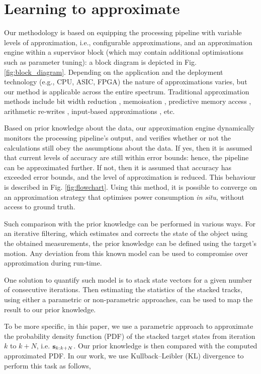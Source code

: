 \section{Learning to approximate}\label{learning}

Our methodology is based on equipping the processing pipeline with variable levels of approximation, i.e., configurable approximations, and an approximation engine within a supervisor block (which may contain additional optimisations such as parameter tuning): a block diagram is depicted in Fig. \ref{fig:block_diagram}. Depending on the application and the deployment technology (e.g., CPU, ASIC, FPGA) the nature of approximations varies, but our method is applicable across the entire spectrum. Traditional approximation methods include bit width reduction \cite{mittal2016survey}, memoisation \cite{sinha2016low}, predictive memory access \cite{yazdanbakhsh2016mitigating}, arithmetic re-writes \cite{nepal2016automated}, input-based approximations \cite{raha2016input}, etc.
\par Based on prior knowledge about the data, our approximation engine dynamically monitors the processing pipeline's output, and verifies whether or not the calculations still obey the assumptions about the data. If yes, then it is assumed that current levels of accuracy are still within error bounds: hence, the pipeline can be approximated further. If not, then it is assumed that accuracy has exceeded error bounds, and the level of approximation is reduced. This behaviour is described in Fig. \ref{fig:flowchart}. Using this method, it is possible to converge on an approximation strategy that optimises power consumption \textit{in situ}, without access to ground truth. 

\par Such comparison with the prior knowledge can be performed in various ways. 
For an iterative filtering, which estimates and corrects the state of the object using the obtained measurements, the prior knowledge can be defined using the target's motion. Any deviation from this known model can be used to compromise over approximation during run-time. 

One solution to quantify such model is to stack state vectors for a given number of consecutive iterations. Then estimating the statistics of the stacked tracks, using either a parametric or non-parametric approaches, can be used to map the result to our prior knowledge. 

To be more specific, in this paper, we use a parametric approach to approximate the probability density function (PDF) of the stacked target states from iteration $k$ to $k+N$, i.e. ${\bf s}_{k:k+N}$. 
Our prior knowledge is then compared with the computed approximated PDF. In our work, we use Kullback–Leibler (KL) divergence to perform this task as follows,

